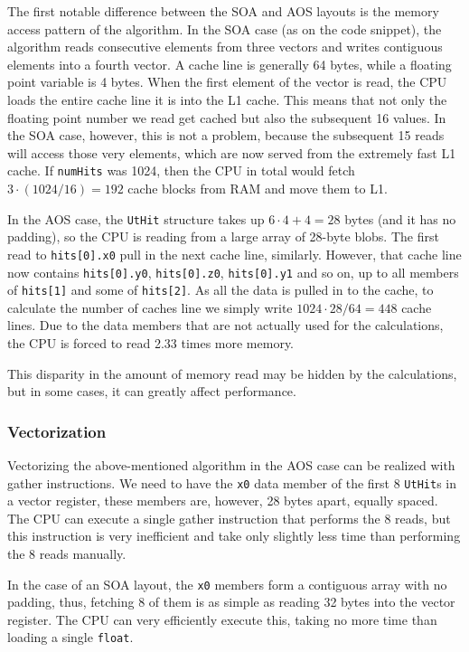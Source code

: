 \documentclass[12pt]{article}
\newcommand{\code}[1]{\texttt{#1}}
\begin{document}
The first notable difference between the SOA and AOS layouts is the memory access pattern of the algorithm. In the SOA case (as on the code snippet), the algorithm reads consecutive elements from three vectors and writes contiguous elements into a fourth vector. A cache line is generally 64 bytes, while a floating point variable is 4 bytes. When the first element of the vector is read, the CPU loads the entire cache line it is into the L1 cache. This means that not only the floating point number we read get cached but also the subsequent 16 values. In the SOA case, however, this is not a problem, because the subsequent 15 reads will access those very elements, which are now served from the extremely fast L1 cache. If \code{numHits} was 1024, then the CPU in total would fetch $3 \cdot (1024/16) = 192$ cache blocks from RAM and move them to L1.

In the AOS case, the \code{UtHit} structure takes up $6 \cdot 4 + 4 = 28$ bytes (and it has no padding), so the CPU is reading from a large array of 28-byte blobs. The first read to \code{hits[0].x0} pull in the next cache line, similarly. However, that cache line now contains \code{hits[0].y0}, \code{hits[0].z0}, \code{hits[0].y1} and so on, up to all members of \code{hits[1]} and some of \code{hits[2]}. As all the data is pulled in to the cache, to calculate the number of caches line we simply write $1024 \cdot 28 / 64 = 448$ cache lines. Due to the data members that are not actually used for the calculations, the CPU is forced to read 2.33 times more memory.

This disparity in the amount of memory read may be hidden by the calculations, but in some cases, it can greatly affect performance.


\subsubsection{Vectorization}

Vectorizing the above-mentioned algorithm in the AOS case can be realized with gather instructions. We need to have the \code{x0} data member of the first 8 \code{UtHit}s in a vector register, these members are, however, 28 bytes apart, equally spaced. The CPU can execute a single gather instruction that performs the 8 reads, but this instruction is very inefficient and take only slightly less time than performing the 8 reads manually.

In the case of an SOA layout, the \code{x0} members form a contiguous array with no padding, thus, fetching 8 of them is as simple as reading 32 bytes into the vector register. The CPU can very efficiently execute this, taking no more time than loading a single \code{float}.
\end{document}
